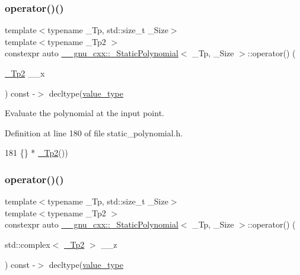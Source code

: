 \subsubsection{\texorpdfstring{operator()()}{operator()()}\hspace{0.1cm}{\footnotesize\ttfamily [2/4]}}
{\footnotesize\ttfamily template$<$typename \+\_\+\+Tp, std\+::size\+\_\+t \+\_\+\+Size$>$ \\
template$<$typename \+\_\+\+Tp2 $>$ \\
constexpr auto \hyperlink{class____gnu__cxx_1_1__StaticPolynomial}{\+\_\+\+\_\+gnu\+\_\+cxx\+::\+\_\+\+Static\+Polynomial}$<$ \+\_\+\+Tp, \+\_\+\+Size $>$\+::operator() (\begin{DoxyParamCaption}\item[{\hyperlink{class____gnu__cxx_1_1__StaticPolynomial_a688f26b7c706701416fad299240aa856}{\+\_\+\+Tp2}}]{\+\_\+\+\_\+x }\end{DoxyParamCaption}) const -\/$>$ decltype(\hyperlink{class____gnu__cxx_1_1__StaticPolynomial_aad5f3d6d5876b6926b30724aeac649d6}{value\+\_\+type}\hspace{0.3cm}{\ttfamily [inline]}}

Evaluate the polynomial at the input point. 

Definition at line 180 of file static\+\_\+polynomial.\+h.


\begin{DoxyCode}
181                               \{\} * \hyperlink{class____gnu__cxx_1_1__StaticPolynomial_a688f26b7c706701416fad299240aa856}{\_Tp2}())
\end{DoxyCode}
\mbox{\label{class____gnu__cxx_1_1__StaticPolynomial_a38a6e07a38db4d58e532148b8bc6c26b}} 
\subsubsection{\texorpdfstring{operator()()}{operator()()}\hspace{0.1cm}{\footnotesize\ttfamily [3/4]}}
{\footnotesize\ttfamily template$<$typename \+\_\+\+Tp, std\+::size\+\_\+t \+\_\+\+Size$>$ \\
template$<$typename \+\_\+\+Tp2 $>$ \\
constexpr auto \hyperlink{class____gnu__cxx_1_1__StaticPolynomial}{\+\_\+\+\_\+gnu\+\_\+cxx\+::\+\_\+\+Static\+Polynomial}$<$ \+\_\+\+Tp, \+\_\+\+Size $>$\+::operator() (\begin{DoxyParamCaption}\item[{std\+::complex$<$ \hyperlink{class____gnu__cxx_1_1__StaticPolynomial_a688f26b7c706701416fad299240aa856}{\+\_\+\+Tp2} $>$}]{\+\_\+\+\_\+z }\end{DoxyParamCaption}) const -\/$>$ decltype(\hyperlink{class____gnu__cxx_1_1__StaticPolynomial_aad5f3d6d5876b6926b30724aeac649d6}{value\+\_\+type}\hspace{0.3cm}{\ttfamily [inline]}}

